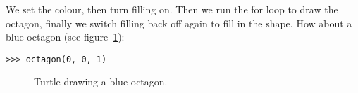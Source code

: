 We set the colour, then turn filling on.  Then we run the for loop to draw the octagon, finally we switch filling back off again to fill in the shape. How about a blue octagon (see figure~\ref{fig49}):

\begin{listing}
\begin{verbatim}
>>> octagon(0, 0, 1)
\end{verbatim}
\end{listing}

\begin{figure}
\begin{center}
\end{center}
\caption{Turtle drawing a blue octagon.}\label{fig49}
\end{figure}
\newpage
